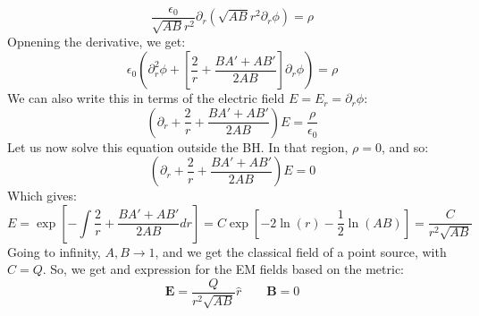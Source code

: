 \documentclass{article}
\begin{document}
\begin{equation}
    \frac{\epsilon_0}{\sqrt{AB}r^2} \partial_r \left(\sqrt{AB}r^2 \partial_r \phi\right) = \rho
\end{equation}
Opnening the derivative, we get:
\begin{equation}
    \epsilon_0\left(
        \partial_r^2 \phi +
        \left[\frac{2}{r} + \frac{BA' + AB'}{2AB}\right] \partial_r \phi
    \right) = \rho
\end{equation}
We can also write this in terms of the electric field $E = E_r = \partial_r \phi$:
\begin{equation}
    \left(
        \partial_r +
        \frac{2}{r} + \frac{BA' + AB'}{2AB}
    \right)E = \frac{\rho}{\epsilon_0}
\end{equation}
Let us now solve this equation outside the BH. In that region, $\rho = 0$, and so:
\begin{equation}
    \left(
        \partial_r +
        \frac{2}{r} + \frac{BA' + AB'}{2AB}
    \right)E = 0
\end{equation}
Which gives:
\begin{equation}
    E = \exp[
        - \int \frac{2}{r} + \frac{BA' + AB'}{2AB} dr
    ] = C\exp[
        - 2\ln(r) - \frac{1}{2}\ln(AB)
    ] = \frac{C}{r^2\sqrt{AB}}
\end{equation}
Going to infinity, $A, B \rightarrow 1$, and we get the classical field of a point source, with $C = Q$. So, we get and expression for the EM fields based on the metric:
\begin{equation}
    \boldsymbol{E} = \frac{Q}{r^2\sqrt{AB}}\hat{r}
    \qquad
    \boldsymbol{B} = 0
\end{equation}
\end{document}

